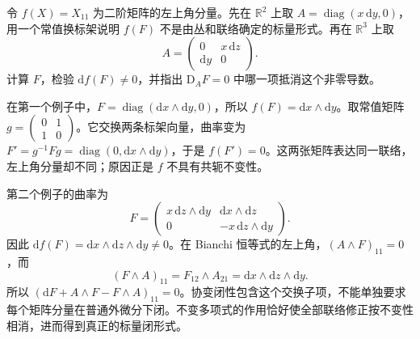 \begin{exercise}\label{g2:ex:noninvariant-curvature-component}
	令 \(f(X)=X_{11}\) 为二阶矩阵的左上角分量。先在 \(\mathbb R^2\) 上取 \(A=\operatorname{diag}(x\,\mathrm dy,0)\)，用一个常值换标架说明 \(f(F)\) 不是由丛和联络确定的标量形式。再在 \(\mathbb R^3\) 上取
	\[
		A=\begin{pmatrix}0&x\,\mathrm dz\\\mathrm dy&0\end{pmatrix}.
	\]
	计算 \(F\)，检验 \(\mathrm d f(F)\ne0\)，并指出 \(\mathrm D_AF=0\) 中哪一项抵消这个非零导数。
\end{exercise}
\begin{solution}
	在第一个例子中，\(F=\operatorname{diag}(\mathrm dx\wedge\mathrm dy,0)\)，所以 \(f(F)=\mathrm dx\wedge\mathrm dy\)。取常值矩阵 \(g=\begin{pmatrix}0&1\\1&0\end{pmatrix}\)。它交换两条标架向量，曲率变为 \(F'=g^{-1}Fg=\operatorname{diag}(0,\mathrm dx\wedge\mathrm dy)\)，于是 \(f(F')=0\)。这两张矩阵表达同一联络，左上角分量却不同；原因正是 \(f\) 不具有共轭不变性。

	第二个例子的曲率为
	\[
		F=\begin{pmatrix}
			x\,\mathrm dz\wedge\mathrm dy&\mathrm dx\wedge\mathrm dz\\
			0&-x\,\mathrm dz\wedge\mathrm dy
		\end{pmatrix}.
	\]
	因此 \(\mathrm df(F)=\mathrm dx\wedge\mathrm dz\wedge\mathrm dy\ne0\)。在 Bianchi 恒等式的左上角，\((A\wedge F)_{11}=0\)，而
	\[
		(F\wedge A)_{11}
		=F_{12}\wedge A_{21}
		=\mathrm dx\wedge\mathrm dz\wedge\mathrm dy.
	\]
	所以 \((\mathrm dF+A\wedge F-F\wedge A)_{11}=0\)。协变闭性包含这个交换子项，不能单独要求每个矩阵分量在普通外微分下闭。不变多项式的作用恰好使全部联络修正按不变性相消，进而得到真正的标量闭形式。
\end{solution}

